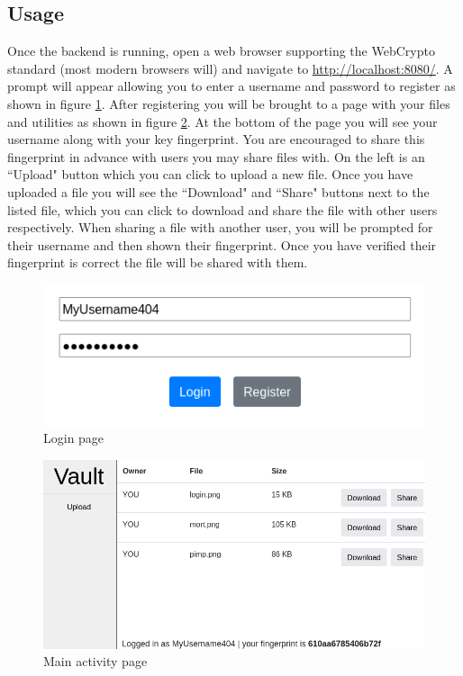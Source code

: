 \documentclass{article}
\begin{document}
\subsection{Usage}
Once the backend is running, open a web browser supporting the WebCrypto standard (most modern browsers will) and navigate to \url{http://localhost:8080/}. A prompt will appear allowing you to enter a username and password to register as shown in figure \ref{fig:login}. After registering you will be brought to a page with your files and utilities as shown in figure \ref{fig:frontpage}. At the bottom of the page you will see your username along with your key fingerprint. You are encouraged to share this fingerprint in advance with users you may share files with. On the left is an ``Upload" button which you can click to upload a new file. Once you have uploaded a file you will see the ``Download" and ``Share" buttons next to the listed file, which you can click to download and share the file with other users respectively. When sharing a file with another user, you will be prompted for their username and then shown their fingerprint. Once you have verified their fingerprint is correct the file will be shared with them.

\begin{figure}
    \centering
    \includegraphics[scale=0.7]{login.png}
    \caption{Login page}
    \label{fig:login}
\end{figure}

\begin{figure}
    \centering
    \includegraphics[scale=0.5]{frontpage_000.png}
    \caption{Main activity page}
    \label{fig:frontpage}
\end{figure}
\end{document}
